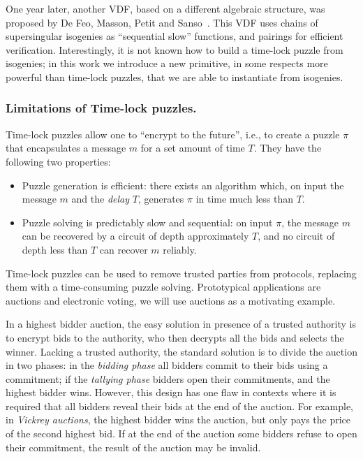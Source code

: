 \documentclass{llncs}
\begin{document}
One year later, another VDF, based on a different algebraic structure,
was proposed by De Feo, Masson, Petit and
Sanso~\cite{10.1007/978-3-030-34578-5_10}. %
This VDF uses chains of supersingular isogenies as ``sequential slow''
functions, and pairings for efficient verification. %
Interestingly, it is not known how to build a time-lock puzzle from
isogenies; in this work we introduce a new primitive, in some respects
more powerful than time-lock puzzles, that we are able to instantiate
from isogenies.

\subsubsection{Limitations of Time-lock puzzles.}
Time-lock puzzles allow one to ``encrypt to the future'', i.e., to
create a puzzle $\pi$ that encapsulates a message $m$ for a set amount
of time $T$. %
They have the following two properties:
\begin{itemize}
\item Puzzle generation is efficient: there exists an algorithm which,
  on input the message $m$ and the \emph{delay} $T$, generates $\pi$
  in time much less than $T$.
\item Puzzle solving is predictably slow and sequential: on input
  $\pi$, the message $m$ can be recovered by a circuit of depth
  approximately $T$, and no circuit of depth less than $T$ can
  recover $m$ reliably.
\end{itemize}

Time-lock puzzles can be used to remove trusted parties from
protocols, replacing them with a time-consuming puzzle solving. %
Prototypical applications are auctions and electronic voting, we will
use auctions as a motivating example.

In a highest bidder auction, the easy solution in presence of a
trusted authority is to encrypt bids to the authority, who then
decrypts all the bids and selects the winner. %
Lacking a trusted authority, the standard solution is to divide the
auction in two phases: in the \emph{bidding phase} all bidders commit
to their bids using a commitment; if the \emph{tallying phase} bidders
open their commitments, and the highest bidder wins. %
However, this design has one flaw in contexts where it is required
that all bidders reveal their bids at the end of the auction. %
For example, in \emph{Vickrey auctions}, the highest bidder wins the
auction, but only pays the price of the second highest bid. %
If at the end of the auction some bidders refuse to open their
commitment, the result of the auction may be invalid.
\end{document}
